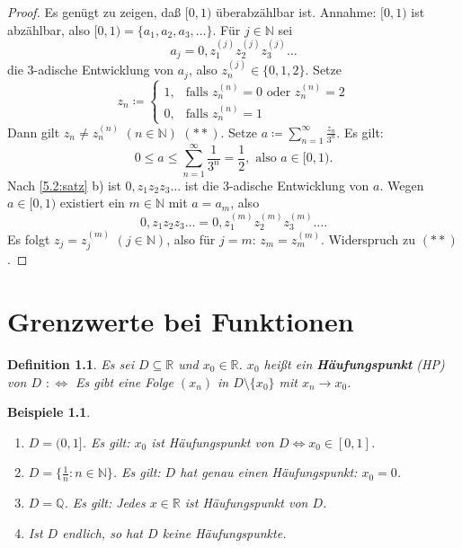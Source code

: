 \documentclass[12pt]{extreport} %
\newcommand{\N}{\mathbb{N}}
\newcommand{\Q}{\mathbb{Q}}
\newcommand{\R}{\mathbb{R}}
\theoremstyle{named}
\theoremstyle{itshape}
\newtheorem*{definition}{Definition}
\theoremstyle{normal}
\newtheorem*{beispiele}{Beispiele}
\begin{document}
\begin{proof}
	Es genügt zu zeigen, da{\ss} $[0, 1)$ überabzählbar ist. Annahme: $[0, 1)$ ist abzählbar, also $[0, 1) = \{ a_{1}, a_{2}, a_3, \dotsc \}$. Für $j \in \N$ sei
		$$ a_{j} = 0, z_{1}^{(j)} z_{2}^{(j)} z_{3}^{(j)} \dotsc $$
	die 3-adische Entwicklung von $a_{j}$, also $z_{n}^{(j)} \in \{ 0, 1, 2 \}$. Setze
		$$ z_{n} \coloneqq \begin{cases} 1, & \text{falls } z_{n}^{(n)} = 0 \text{ oder } z_{n}^{(n)} = 2 \\ 0, & \text{falls } z_{n}^{(n)} = 1 \end{cases} $$
	Dann gilt $z_{n} \neq z_{n}^{(n)}$ $(n \in \N)$ $(**)$. Setze $a \coloneqq \sum_{n=1}^{\infty} \frac{z_{n}}{3^{n}}$. Es gilt:
		$$ 0 \leq a \leq \sum_{n=1}^{\infty} \frac{1}{3^{n}} = \frac{1}{2}, \text{ also } a \in [0, 1). $$
	Nach  \ref{5.2:satz} b) ist $0, z_{1} z_{2} z_{3} \dotsc$ ist die 3-adische Entwicklung von $a$. Wegen $a \in [0, 1)$ existiert ein $m \in \N$ mit $a = a_{m}$, also
		$$ 0, z_{1} z_{2} z_{3} \dotsc = 0, z_{1}^{(m)} z_{2}^{(m)} z_{3}^{(m)}\dotsc. $$
	Es folgt $z_{j} = z_{j}^{(m)}$ $(j \in \N)$, also für $j = m$: $z_{m} = z_{m}^{(m)}$. Widerspruch zu $(**)$.
\end{proof}


\newpage


\chapter{Grenzwerte bei Funktionen}

\begin{definition}
	Es sei $D \subseteq \R$ und $x_{0} \in \R$. $x_{0}$ hei{\ss}t ein \textbf{Häufungspunkt} (HP) von $D$ $:\iff$ Es gibt eine Folge $(x_{n})$ in $D \setminus \{ x_{0} \}$ 
	mit $x_{n} \rightarrow x_{0}$.
\end{definition}


\begin{beispiele} \
	\begin{enumerate}
		\item $D = (0, 1]$. Es gilt:  
			$x_{0}$ ist Häufungspunkt von $D \iff x_{0} \in [0, 1]$.
		\item $D = \{ \frac{1}{n} : n \in \N \}$. Es gilt:  
		      $D$ hat genau einen Häufungspunkt: $x_{0} = 0$.
		\item $D=\Q$. Es gilt: 
		      Jedes $x \in \R$ ist Häufungspunkt von $D$. 
		\item Ist $D$ endlich, so hat $D$ keine Häufungspunkte.
		
	\end{enumerate}	
\end{beispiele}
\end{document}
